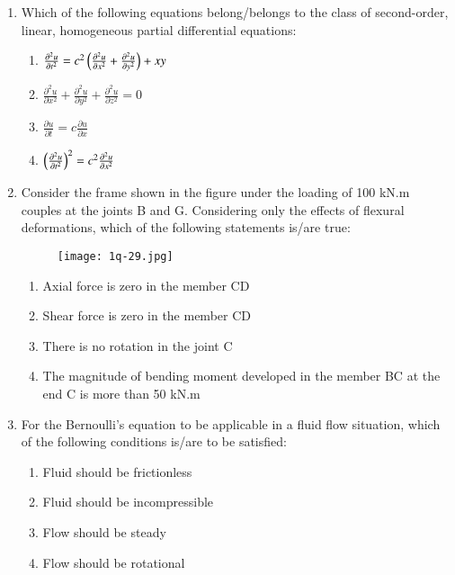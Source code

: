 \documentclass[journal,12pt,onecolumn]{article}
\theoremstyle{remark}
\begin{document}
\begin{enumerate}
\item Which of the following equations belong/belongs to the class of second-order, linear, homogeneous partial differential equations:

\hfill{}
\begin{enumerate}
    \item $\frac{\partial^2 u}{\partial t^2} = c^2 \left(\frac{\partial^2 u}{\partial x^2} + \frac{\partial^2 u}{\partial y^2}\right) + xy$
    \item $\frac{\partial^2 u}{\partial x^2} + \frac{\partial^2 u}{\partial y^2} + \frac{\partial^2 u}{\partial z^2} = 0$
    \item $\frac{\partial u}{\partial t} = c \frac{\partial u}{\partial x}$
    \item $\left(\frac{\partial^2 u}{\partial t^2}\right)^2 = c^2 \frac{\partial^2 u}{\partial x^2}$
\end{enumerate}

\item Consider the frame shown in the figure  under the loading of 100 kN.m couples at the joints B and G. Considering only the effects of flexural deformations, which of the following statements is/are true:
\begin{figure}[H]
    \centering
    \texttt{[image: 1q-29.jpg]}
    \caption{}
    \label{fig:q29}
\end{figure}

\hfill{}
\begin{enumerate}
    \item Axial force is zero in the member CD
    \item Shear force is zero in the member CD
    \item There is no rotation in the joint C
    \item The magnitude of bending moment developed in the member BC at the end C is more than 50 kN.m
\end{enumerate}

\item For the Bernoulli's equation to be applicable in a fluid flow situation, which of the following conditions is/are to be satisfied:

\hfill{}
\begin{enumerate}
    \item Fluid should be frictionless
    \item Fluid should be incompressible
    \item Flow should be steady
    \item Flow should be rotational
\end{enumerate}


\end{enumerate}
\end{document}
